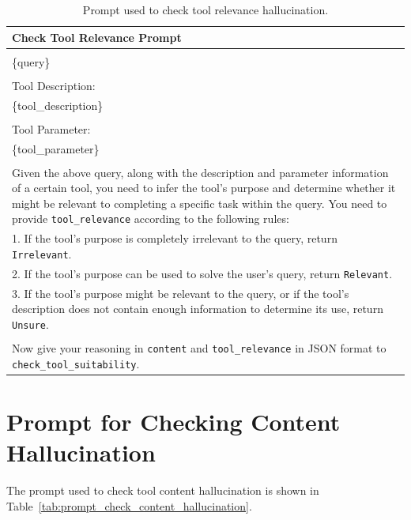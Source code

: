 \begin{table}[ht!]
    \centering
    \caption{Prompt used to check tool relevance hallucination.}
    \begin{tabular}{l}
    \toprule
    \rowcolor[gray]{0.95} 
    \textbf{Check Tool Relevance Prompt} \\
    \midrule
    \makecell[l{p{\textwidth}}]{
Query:\\
\{query\}\\
\\
Tool Description:\\
\{tool\_description\}\\
\\
Tool Parameter:\\
\{tool\_parameter\}\\
\\
Given the above query, along with the description and parameter information of a certain tool, you need to infer the tool's purpose and determine whether it might be relevant to completing a specific task within the query. You need to provide \texttt{tool\_relevance} according to the following rules:\\
1. If the tool's purpose is completely irrelevant to the query, return \texttt{Irrelevant}.\\
2. If the tool's purpose can be used to solve the user's query, return \texttt{Relevant}.\\
3. If the tool's purpose might be relevant to the query, or if the tool's description does not contain enough information to determine its use, return \texttt{Unsure}.\\
\\
Now give your reasoning in \texttt{content} and \texttt{tool\_relevance} in JSON format to \texttt{check\_tool\_suitability}.}
\\
    \bottomrule
    \end{tabular}

    \label{tab:prompt_check_tool_relevance}
\end{table}


\section{Prompt for Checking Content Hallucination}
\label{sec:prompt_check_content_hallucination}
The prompt used to check tool content hallucination is shown in Table~\ref{tab:prompt_check_content_hallucination}.

